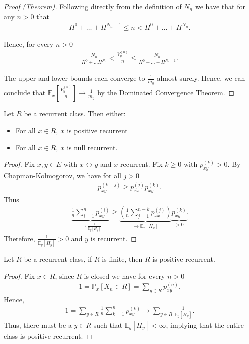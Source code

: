 \begin{proof}[Proof (Theorem)]
Following directly from the definition of $N_n$ we have that for any $n> 0$ that 
\begin{align}
	H^0 + \ldots + H^{N_n -1} \leq n < H^0 + \ldots + H^{N_n}
.\end{align}
	
Hence, for every $n> 0$ 
\begin{align}
\frac{N_n}{H^0 + \ldots H^{N_n}} < \frac{V_y^{(n)}}{n} \leq \frac{N_n}{H^0 + \ldots + H^{N_n -1}} 
.\end{align}

The upper and lower bounds each converge to $\frac{1}{m_y}$ almost surely. Hence, we can conclude that $\mathbb{E}_{x} \left[ \frac{V_y^{(n)}}{n} \right] \to \frac{1}{m_y}$ by the Dominated Convergence Theorem.
\end{proof}


\begin{prop}
	Let $R$ be a recurrent class. Then either:
\begin{itemize}
	\item For all $x \in R,\ x$ is positive recurrent
	\item For all $x \in R,\ x$ is null recurrent.
\end{itemize}
\end{prop}
\begin{proof}
	Fix $x,y \in E$ with $x  \leftrightarrow  y$ and $x$ recurrent. Fix $k\geq 0$ with $p_{xy}^{(k)}>0$. By Chapman-Kolmogorov, we have for all $j> 0$
	\begin{align}
		p_{xy}^{(k+j)} \geq p_{xx}^{(j)} p_{xy}^{(k)}	
.	\end{align}
Thus	
\begin{align}
	\underbrace{\frac{1}{n} \sum_{i=1}^{n} p_{xy}^{(i)}}_{\to  \frac{1}{\mathbb{E}_{y} \left[ H_y \right] }} \geq \underbrace{\left( \frac{1}{n} \sum_{j=1}^{n-k} p_{xx}^{(j)} \right)}_{\to \mathbb{E}_{x} \left[ H_x \right]} \underbrace{p_{xy}^{(k)}}_{>0}
.\end{align}
Therefore, $\frac{1}{\mathbb{E}_{y} \left[ H_y \right] }> 0$ and $y$ is recurrent.
\end{proof}


\begin{prop}[]
	Let $R$ be a recurrent class, if $R$ is finite, then $R$ is positive recurrent.
\end{prop}
\begin{proof}
	Fix $x\in R$, since $R$ is closed we have for every $n> 0$
	\begin{align}
		1 = \mathbb{P}_{x} \left[ X_n \in R \right] = \sum_{y\in R}^{} p_{xy}^{(n)}.
	\end{align}
Hence, 
\begin{align}
	1 = \sum_{y\in R}^{} \frac{1}{n} \sum_{k=1}^{n} p_{xy}^{(k)} \to \sum_{y \in R}^{} \frac{1}{\mathbb{E}_{y} \left[ H_y \right] }.
\end{align}
Thus, there must be a $y\in R$ such that $\mathbb{E}_{y} \left[ H_y \right] < \infty $, implying that the entire class is positive recurrent.
\end{proof}


